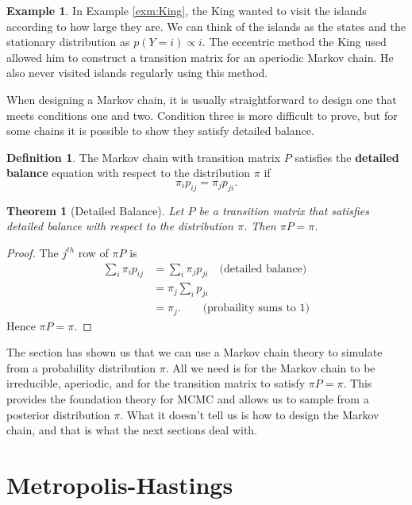 \documentclass[
]{book}
\newtheorem{theorem}{Theorem}[chapter]
\theoremstyle{definition}
\newtheorem{definition}{Definition}[chapter]
\theoremstyle{definition}
\newtheorem{example}{Example}[chapter]
\theoremstyle{definition}
\theoremstyle{definition}
\theoremstyle{remark}
\begin{document}
\begin{example}
In Example \ref{exm:King}, the King wanted to visit the islands according to how large they are. We can think of the islands as the states and the stationary distribution as \(p(Y = i) \propto i\). The eccentric method the King used allowed him to construct a transition matrix for an aperiodic Markov chain. He also never visited islands regularly using this method.
\end{example}

When designing a Markov chain, it is usually straightforward to design one that meets conditions one and two. Condition three is more difficult to prove, but for some chains it is possible to show they satisfy detailed balance.

\begin{definition}
The Markov chain with transition matrix \(P\) satisfies the \textbf{detailed balance} equation with respect to the distribution \(\pi\) if
\[
\pi_i p_{ij} = \pi_j p_{ji}. 
\]
\end{definition}

\begin{theorem}[Detailed Balance]
Let \(P\) be a transition matrix that satisfies detailed balance with respect to the distribution \(\pi\). Then \(\pi P = \pi\).
\end{theorem}

\begin{proof}
The \(j^{th}\) row of \(\pi P\) is
\begin{align*}
\sum_{i} \pi_i p_{ij} & = \sum_{i} \pi_j p_{ji} \quad \textrm{(detailed balance)} \\
 & = \pi_j \sum_{i} p_{ji} \\
 & = \pi_j.\qquad \textrm{(probaility sums to 1)}
\end{align*}
Hence \(\pi P = \pi\).
\end{proof}

The section has shown us that we can use a Markov chain theory to simulate from a probability distribution \(\pi\). All we need is for the Markov chain to be irreducible, aperiodic, and for the transition matrix to satisfy \(\pi P = \pi\). This provides the foundation theory for MCMC and allows us to sample from a posterior distribution \(\pi\). What it doesn't tell us is how to design the Markov chain, and that is what the next sections deal with.

\hypertarget{metropolis-hastings}{%
\section{Metropolis-Hastings}\label{metropolis-hastings}}
\end{document}
